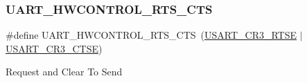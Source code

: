 \subsubsection{\texorpdfstring{UART\_HWCONTROL\_RTS\_CTS}{UART\_HWCONTROL\_RTS\_CTS}}
{\footnotesize\ttfamily \#define U\+A\+R\+T\+\_\+\+H\+W\+C\+O\+N\+T\+R\+O\+L\+\_\+\+R\+T\+S\+\_\+\+C\+TS~(\mbox{\hyperlink{group___peripheral___registers___bits___definition_ga7c5d6fcd84a4728cda578a0339b4cac2}{U\+S\+A\+R\+T\+\_\+\+C\+R3\+\_\+\+R\+T\+SE}} $\vert$ \mbox{\hyperlink{group___peripheral___registers___bits___definition_gaa125f026b1ca2d76eab48b191baed265}{U\+S\+A\+R\+T\+\_\+\+C\+R3\+\_\+\+C\+T\+SE}})}

Request and Clear To Send 